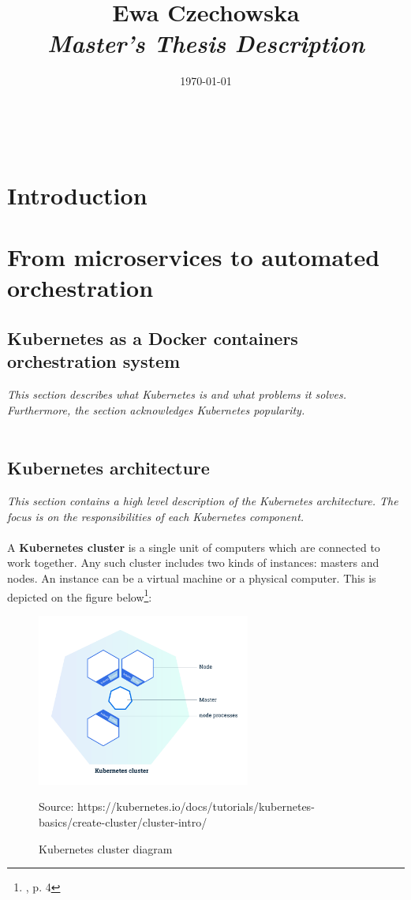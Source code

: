 \documentclass[12pt]{article}
\title{
{\small Ewa Czechowska } \\
\bf\textit{ Master’s Thesis Description } \\
\vspace{4cm}}
\date{\today}
\begin{document}
\maketitle
~\vspace{8cm}
\newpage

\section{Introduction}
\section{From microservices to automated orchestration}
\subsection{Kubernetes as a Docker containers orchestration system}
\textit{This section describes what Kubernetes is and what problems it solves. Furthermore, the section acknowledges Kubernetes popularity.}
~\\
~\\
\subsection{Kubernetes architecture}
\textit{This section contains a high level description of the Kubernetes architecture. The focus is on the responsibilities of each Kubernetes component.}
~\\
~\\
A \textbf{Kubernetes cluster} is a single unit of computers which are connected to work together. Any such cluster includes two kinds of instances: masters and nodes. An instance can be a virtual machine or a physical computer. This is depicted on the figure below\footnote{\cite{k8s-cluster}, p. 4}:
\begin{figure}[H]
    \centering
    \includegraphics[width=7cm]{figures/cluster.png}
    \label{fig:cluster}
    \caption{Kubernetes cluster diagram}
    \small{Source: https://kubernetes.io/docs/tutorials/kubernetes-basics/create-cluster/cluster-intro/}
\end{figure}
\end{document}
